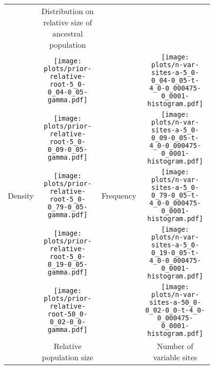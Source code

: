 \documentclass[border=10pt,varwidth=30cm]{standalone}
\begin{document}
\begin{figure}
    \centering
    \begin{tabular}{@{}cccc@{}}
        & \multirow{1}{0.15\textwidth}{\centering\Large Distribution on relative size of ancestral population}
        &
        & \\[9ex]%
        \multirow{5}{*}[-14em]{\begin{sideways}\large Density\end{sideways}}
        & \texttt{[image: plots/prior-relative-root-5\_0-0\_04-0\_05-gamma.pdf]}
        & \multirow{5}{*}[-14em]{\begin{sideways}\large Frequency\end{sideways}}
        & \texttt{[image: plots/n-var-sites-a-5\_0-0\_04-0\_05-t-4\_0-0\_000475-0\_0001-histogram.pdf]} \\
        & \texttt{[image: plots/prior-relative-root-5\_0-0\_09-0\_05-gamma.pdf]}
        &
        & \texttt{[image: plots/n-var-sites-a-5\_0-0\_09-0\_05-t-4\_0-0\_000475-0\_0001-histogram.pdf]} \\
        & \texttt{[image: plots/prior-relative-root-5\_0-0\_79-0\_05-gamma.pdf]}
        &
        & \texttt{[image: plots/n-var-sites-a-5\_0-0\_79-0\_05-t-4\_0-0\_000475-0\_0001-histogram.pdf]} \\
        & \texttt{[image: plots/prior-relative-root-5\_0-0\_19-0\_05-gamma.pdf]}
        &
        & \texttt{[image: plots/n-var-sites-a-5\_0-0\_19-0\_05-t-4\_0-0\_000475-0\_0001-histogram.pdf]} \\
        & \texttt{[image: plots/prior-relative-root-50\_0-0\_02-0\_0-gamma.pdf]}
        &
        & \texttt{[image: plots/n-var-sites-a-50\_0-0\_02-0\_0-t-4\_0-0\_000475-0\_0001-histogram.pdf]} \\
        & \multirow{1}{0.15\textwidth}{\centering\large Relative population size}
        &
        & \multicolumn{1}{c}{Number of variable sites} \\
    \end{tabular}
\end{figure}
\end{document}
